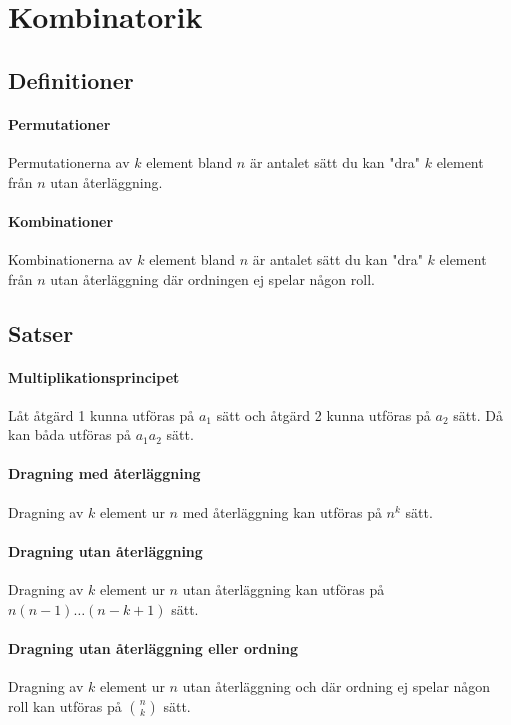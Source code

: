 \section{Kombinatorik}

\subsection{Definitioner}

\paragraph{Permutationer}
Permutationerna av $k$ element bland $n$ är antalet sätt du kan "dra" $k$ element från $n$ utan återläggning.

\paragraph{Kombinationer}
Kombinationerna av $k$ element bland $n$ är antalet sätt du kan "dra" $k$ element från $n$ utan återläggning där ordningen ej spelar någon roll.

\subsection{Satser}

\paragraph{Multiplikationsprincipet}
Låt åtgärd 1 kunna utföras på $a_1$ sätt och åtgärd 2 kunna utföras på $a_2$ sätt. Då kan båda utföras på $a_1a_2$ sätt.

\proof

\paragraph{Dragning med återläggning}
Dragning av $k$ element ur $n$ med återläggning kan utföras på $n^k$ sätt.

\proof

\paragraph{Dragning utan återläggning}
Dragning av $k$ element ur $n$ utan återläggning kan utföras på $n(n - 1)\dots (n - k +1)$ sätt.

\proof

\paragraph{Dragning utan återläggning eller ordning}
Dragning av $k$ element ur $n$ utan återläggning och där ordning ej spelar någon roll kan utföras på $\binom{n}{k}$ sätt.

\proof
